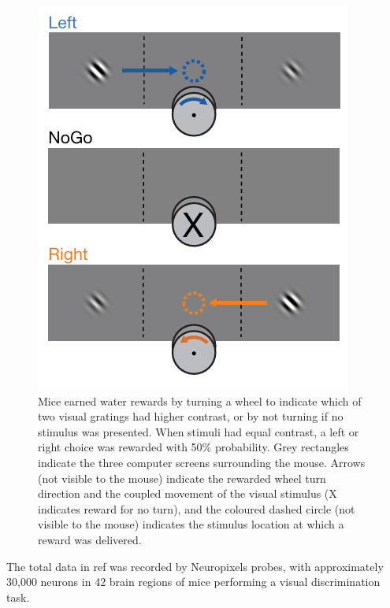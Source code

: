 \documentclass{article}
\begin{document}
	\begin{figure}[htbp]
		\centering
		\includegraphics[scale = 0.7]{Pics/001}
		\caption{Mice earned water rewards by turning a wheel to indicate which of 
			two visual gratings had higher contrast, or by not turning if no stimulus was 
			presented. When stimuli had equal contrast, a left or right choice was rewarded 
			with 50\% probability. Grey rectangles indicate the three computer screens 
			surrounding the mouse. Arrows (not visible to the mouse) indicate the rewarded 
			wheel turn direction and the coupled movement of the visual stimulus (X 
			indicates reward for no turn), and the coloured dashed circle (not visible to the 
			mouse) indicates the stimulus location at which a reward was delivered.}
		\label{fig:001}
	\end{figure}
	\par The total data in ref\cite{ref1} was recorded by Neuropixels probes, with approximately 30,000 neurons in 42 brain regions of mice performing a visual discrimination task. 
\end{document}
